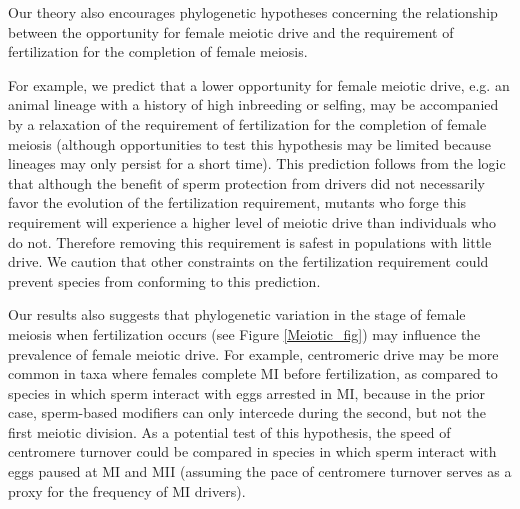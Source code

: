\documentclass[12pt,letterpaper]{article}
\begin{document}
Our theory also encourages phylogenetic hypotheses concerning the relationship between the opportunity 
	for female meiotic drive and the requirement of fertilization for the completion of female meiosis. 


For example, we predict that a lower opportunity for female meiotic drive,
        e.g. an animal lineage with a history of high inbreeding or selfing, 
        may be accompanied by a relaxation of the requirement of fertilization for the
        completion of female meiosis (although 
        opportunities to test this hypothesis may be limited because 
        lineages may only persist for a short time). 
This prediction follows from the logic that although the benefit of sperm protection from drivers did not necessarily favor the evolution of the fertilization requirement, 
	mutants who forge this requirement will experience a higher level of meiotic drive than individuals who do not.  
Therefore removing this requirement is safest in populations with little drive. 
We caution that other constraints on the fertilization requirement could prevent species from conforming to this prediction.

 
Our results also suggests that phylogenetic variation in the stage of female meiosis when
        fertilization occurs (see Figure \ref{Meiotic_fig}) may influence the prevalence of  female meiotic drive.
For example, centromeric drive may be more common  in taxa where females complete MI before fertilization, 
	as compared to species in which sperm interact with eggs arrested  in MI, 
	because in the prior case, sperm-based modifiers can only intercede during the second, but not the first  meiotic division. 
As a potential test of this hypothesis, the speed of centromere
	turnover could be compared in species in which sperm interact with eggs paused at MI and MII 
	(assuming the pace of centromere turnover serves as a proxy for the frequency of MI drivers). 
\newline
\end{document}
